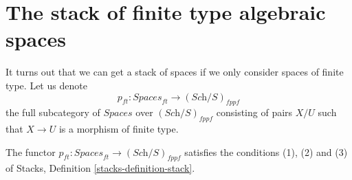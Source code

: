 \section{The stack of finite type algebraic spaces}
\label{section-stack-of-finite-type-spaces}


\noindent
It turns out that we can get a stack of spaces
if we only consider spaces of finite type.
Let us denote
$$
p_{ft} : \textit{Spaces}_{ft} \to (\textit{Sch}/S)_{fppf}
$$
the full subcategory of $\textit{Spaces}$ over $(\textit{Sch}/S)_{fppf}$ 
consisting of pairs $X/U$ such that $X \to U$
is a morphism of finite type.

\begin{lemma}
\label{lemma-stack-of-finite-type-spaces}
The functor
$p_{ft} : \textit{Spaces}_{ft} \to (\textit{Sch}/S)_{fppf}$
satisfies the conditions (1), (2) and (3) of
Stacks, Definition \ref{stacks-definition-stack}.
\end{lemma}

